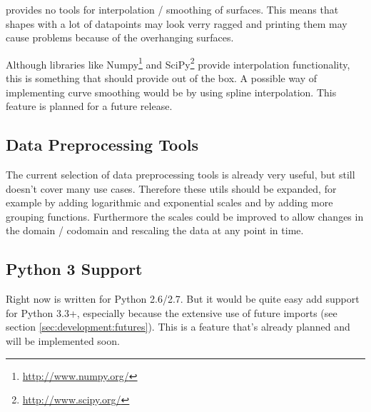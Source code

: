 \tangible{} provides no tools for interpolation / smoothing of surfaces. This
means that shapes with a lot of datapoints may look verry ragged and printing
them may cause problems because of the overhanging surfaces.

Although libraries like Numpy\footnote{\url{http://www.numpy.org/}} and
SciPy\footnote{\url{http://www.scipy.org/}} provide interpolation functionality,
this is something that \tangible{} should provide out of the box. A possible way
of implementing curve smoothing would be by using spline interpolation. This
feature is planned for a future release.

\subsection{Data Preprocessing Tools}

The current selection of data preprocessing tools is already very useful, but
still doesn't cover many use cases. Therefore these utils should be expanded,
for example by adding logarithmic and exponential scales and by adding more
grouping functions. Furthermore the scales could be improved to allow changes in
the domain / codomain and rescaling the data at any point in time.

\subsection{Python 3 Support}

Right now \tangible{} is written for Python 2.6/2.7. But it would be quite easy
add support for Python 3.3+, especially because the extensive use of future
imports (see section \ref{sec:development:futures}). This is a feature that's
already planned and will be implemented soon.


